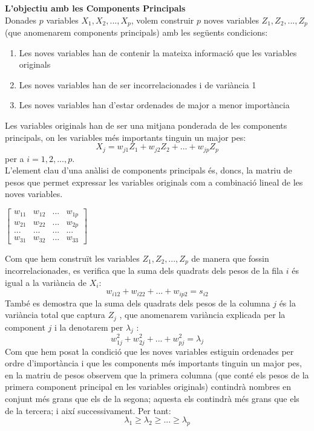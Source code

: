 \documentclass[english]{article}
\begin{document}
\noindent\textbf{L'objectiu amb les Components Principals}\\

Donades $p$ variables $X_1, X_2,...,X_p$, volem construir $p$ noves variables $Z_1,Z_2,...,Z_p$ (que anomenarem components principals) amb les següents condicions:
\begin{enumerate}
\item Les noves variables han de contenir la mateixa informació que les variables originals
\item Les noves variables han de ser incorrelacionades i de variància 1
\item Les noves variables han d'estar ordenades de major a menor importància
\end{enumerate}
Les variables originals han de ser una mitjana ponderada de les components principals,
on les variables més importants tinguin un major pes:
\begin{equation*}
 X_j = w_{j1} Z_1 + w_{j2} Z_2 + ... + w_{jp} Z_p
\end{equation*}
per a $i = 1,2,...,p$.
\\

L'element clau d'una anàlisi de components principals és, doncs, la matriu de pesos que
permet expressar les variables originals com a combinació lineal de les noves variables.
\begin{center}
$ \begin{bmatrix}
w_{11} & w_{12} & ... & w_{1p}\\
w_{21} & w_{22} & ... & w_{2p} \\
... & ... & ... & ... \\
w_{31} & w_{32} & ... & w_{33}
\end{bmatrix}  $
\end{center}
Com que hem construït les variables $Z_1,Z_2,...,Z_p$ de manera que fossin incorrelacionades, es verifica que la suma dels quadrats dels pesos de la fila $i$ és igual a la variància de $X_i$:
\begin{equation*}
    w_{i12} + w_{i22} + ... + w_{ip2} = s_{i2}
\end{equation*}
També es demostra que la suma dels quadrats dels pesos de la columna $j$ és la variància
total que captura $Z_j$ , que anomenarem variància explicada per la component $j$ i la
denotarem per $\lambda_j$ :
\begin{equation*}
w_{1j}^2 + w_{2j}^2 + ... + w_{pj}^2 = \lambda_{j}
\end{equation*}
Com que hem posat la condició que les noves variables estiguin ordenades per ordre
d'importància i que les components més importants tinguin un major pes, en la matriu de
pesos observem que la primera columna (que conté els pesos de la primera component
principal en les variables originals) contindrà nombres en conjunt més grans que els de la
segona; aquesta els contindrà més grans que els de la tercera; i així successivament. Per
tant:
\begin{equation*}
\lambda_{1} \geq \lambda_{2} \geq ... \geq \lambda_{p}
\end{equation*}
\end{document}
